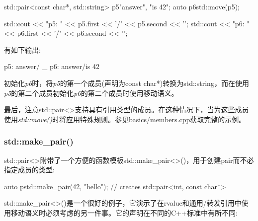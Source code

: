 \begin{cppcode}
std::pair<const char*, std::string> p5{"answer", "is 42"};
auto p6{std::move(p5)};

std::cout << "p5: " << p5.first << '/' << p5.second << '\n';
std::cout << "p6: " << p6.first << '/' << p6.second << '\n';
\end{cppcode}

有如下输出:

\begin{shell}
p5: answer/ _
p6: answer/is 42
\end{shell}

初始化\textit{p6}时，将\textit{p5}的第一个成员(声明为const char*)转换为std::string，而在使用\textit{p5}的第二个成员初始化\textit{p6}的第二个成员时使用移动语义。

最后，注意std::pair<>支持具有引用类型的成员。在这种情况下，当为这些成员使用\textit{std::move()}时将应用特殊规则。参见basics/members.cpp获取完整的示例。

\subsubsection{std::make_pair()}

std::pair<>附带了一个方便的函数模板std::make_pair<>()，用于创建pair而不必指定成员的类型:

\begin{cppcode}
auto p{std::make_pair(42, "hello")}; // creates std::pair<int, const char*>
\end{cppcode}

std::make_pair<>()是一个很好的例子，它演示了在rvalue和通用/转发引用中使用移动语义时必须考虑的另一件事。它的声明在不同的C++标准中有所不同:


